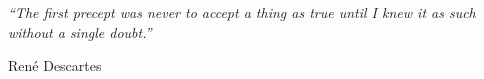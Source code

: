 \setlength{}
\setlength\epigraphrule{0pt}

\vspace*{\fill}

\epigraph{\textit{``The first precept was never to accept a thing as true until I knew it as such without a single doubt.''}}{René Descartes}
